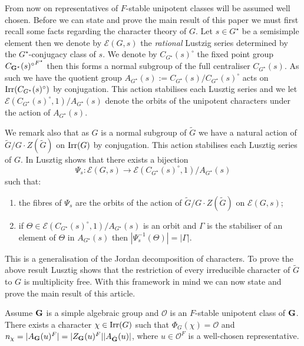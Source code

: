 \documentclass{jt-calcs}
\begin{document}
From now on representatives of $F$-stable unipotent classes will be assumed well chosen. Before we can state and prove the main result of this paper we must first recall some facts regarding the character theory of $G$. Let $s \in G^{\star}$ be a semisimple element then we denote by $\mathcal{E}(G,s)$ the \emph{rational} Lustzig series determined by the $G^{\star}$-conjugacy class of $s$. We denote by $C_{G^{\star}}(s)^{\circ}$ the fixed point group ${C_{\mathbf{G}^{\star}}(s)^{\circ}}^{F^{\star}}$ then this forms a normal subgroup of the full centraliser $C_{G^{\star}}(s)$. As such we have the quotient group $A_{G^{\star}}(s) := C_{G^{\star}}(s)/C_{G^{\star}}(s)^{\circ}$ acts on $\operatorname{Irr}(C_{G^{\star}}(s)^{\circ})$ by conjugation. This action stabilises each Lusztig series and we let $\mathcal{E}(C_{G^{\star}}(s)^{\circ},1)/A_{G^{\star}}(s)$ denote the orbits of the unipotent characters under the action of $A_{G^{\star}}(s)$.

We remark also that as $G$ is a normal subgroup of $\tilde{G}$ we have a natural action of $\tilde{G}/G\cdot Z(\tilde{G})$ on $\operatorname{Irr}(G)$ by conjugation. This action stabilises each Lusztig series of $G$. In \cite[Proposition 5.1]{lusztig:1988:reductive-groups-with-a-disconnected-centre} Lusztig shows that there exists a bijection
\begin{equation}\label{jordan-decomp}
\Psi_s : \mathcal{E}(G,s) \to \mathcal{E}(C_{G^{\star}}(s)^{\circ},1)/A_{G^{\star}}(s)
\end{equation}
such that:
\begin{enumerate}
\renewcommand{\theenumi}{(\roman{enumi})}
	\item the fibres of $\Psi_s$ are the orbits of the action of $\tilde{G}/G\cdot Z(\tilde{G})$ on $\mathcal{E}(G,s)$;
	\item if $\Theta \in \mathcal{E}(C_{G^{\star}}(s)^{\circ},1)/A_{G^{\star}}(s)$ is an orbit and $\Gamma$ is the stabiliser of an element of $\Theta$ in $A_{G^{\star}}(s)$ then $|\Psi_s^{-1}(\Theta)| = |\Gamma|$.
\end{enumerate}
This is a generalisation of the Jordan decomposition of characters. To prove the above result Lusztig shows that the restriction of every irreducible character of $\tilde{G}$ to $G$ is multiplicity free. With this framework in mind we can now state and prove the main result of this article.

\begin{thm}\label{thm:A}
Assume $\mathbf{G}$ is a simple algebraic group and $\mathcal{O}$ is an $F$-stable unipotent class of $\mathbf{G}$. There exists a character $\chi \in \operatorname{Irr}(G)$ such that $\Phi_G(\chi) = \mathcal{O}$ and $n_{\chi} = |A_{\mathbf{G}}(u)^F| = |Z_{\mathbf{G}}(u)^F||A_{\tilde{\mathbf{G}}}(u)|$, where $u \in \mathcal{O}^F$ is a well-chosen representative.
\end{thm}
\end{document}
